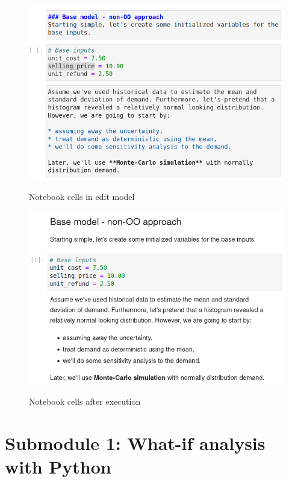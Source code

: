 \documentclass[ited,blindrev]{informs3}              %
\begin{document}
\begin{figure}[!htbp]
	\centering
	\caption{Notebook cells in edit model}
	\includegraphics[scale=0.5]{images/cells_edit_mode.png}
	\label{fig:cells_edit_mode}
\end{figure}

\begin{figure}[!htbp]
	\centering
	\caption{Notebook cells after execution}
	\includegraphics[scale=0.5]{images/cells_after_running.png}
	\label{fig:cells_after_running}
\end{figure}


\section{Submodule 1: What-if analysis with Python}
\end{document}
